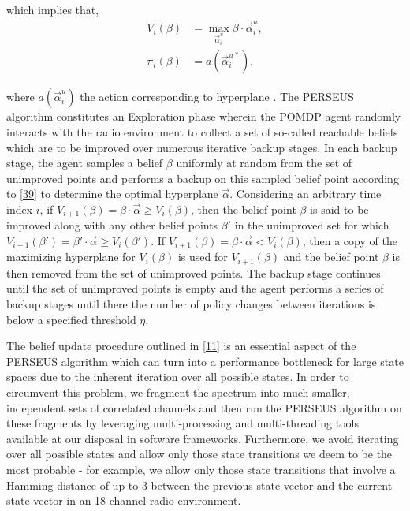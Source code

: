\documentclass[10pt,twocolumn]{IEEEtran}
\newcommand{\sst}[1]{}
\newcommand{\nm}[1]{}
\newcommand{\add}[1]{{\color{red}{#1}}}
\begin{document}
which implies that,
\begin{equation}\label{40}
    \begin{split}
        V_i(\beta) &= \max_{\vec{\alpha}_{i}^u} \beta \cdot \vec{\alpha}_{i}^u,\\
        \pi_i(\beta) &= a(\vec{\alpha}_i^{u*}),
    \end{split}
\end{equation}
\nm{max from which set?}
where $a(\vec{\alpha}_i^{u})$\sst{ refers to} \add{is} the action corresponding to\sst{ the optimal} hyperplane \add{$\vec{\alpha}_i^{u}$}. The PERSEUS algorithm constitutes an Exploration phase\nm{i am not sure I understand this thing about exploration... PERSEUS is NOT an online algorithm} wherein the POMDP agent randomly interacts with the radio environment to collect a set of so-called reachable beliefs which are to be improved over numerous iterative backup stages. In each backup stage, the agent samples a belief $\beta$ uniformly at random from the set of unimproved points and performs a backup on this sampled belief point according to \eqref{39}\nm{how do you compute the new hyperplanes? You are not showing that} to determine the optimal hyperplane $\vec{\alpha}$. Considering an arbitrary time index $i$, if $V_{i+1}(\beta) = \beta \cdot \vec{\alpha} \geq V_{i}(\beta)$, then the belief point $\beta$ is said to be improved along with any other belief points $\beta'$ in the unimproved set for which $V_{i+1}(\beta') = \beta' \cdot \vec{\alpha} \geq V_{i}(\beta')$. If $V_{i+1}(\beta) = \beta \cdot \vec{\alpha} < V_{i}(\beta)$, then a copy of the maximizing hyperplane for $V_i(\beta)$ is used for $V_{i+1}(\beta)$ and the belief point $\beta$ is then removed from the set of unimproved points. The backup stage continues until the set of unimproved points is empty and the agent performs a series of backup stages until there the number of policy changes between iterations is below a specified threshold $\eta$.

The belief update procedure outlined in \eqref{11} is an essential aspect of the PERSEUS algorithm which can turn into a performance bottleneck for large state spaces due to the inherent iteration over all possible states. In order to circumvent this problem, we fragment the spectrum into much smaller, independent sets of correlated channels and then run the PERSEUS algorithm on these fragments by leveraging multi-processing and multi-threading tools available at our disposal in software frameworks. Furthermore, we avoid iterating over all possible states and allow only those state transitions we deem to be the most probable - for example, we allow only those state transitions that involve a Hamming distance of up to 3 between the previous state vector and the current state vector in an 18 channel radio environment.\nm{ you need to provide more details here, including math..}
\end{document}
